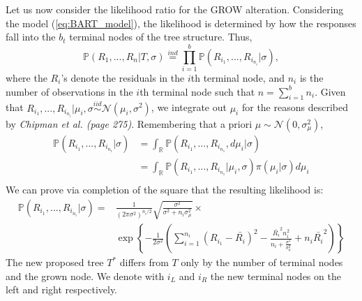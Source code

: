 \documentclass[11pt,a4paper]{article}
\newcommand{\prob}{\mathbb{P}}
\begin{document}
Let us now consider the likelihood ratio for the GROW alteration.
Considering the model (\ref{eq:BART_model}), the likelihood is determined by how the responses fall into the $b_t$ terminal nodes of the tree structure. Thus,
\begin{equation}
    \label{eq:likelihood_ratio_deriv}
    \prob(R_1, ... , R_n | T, \sigma) \overset{ind}{=} \prod_{i = 1}^b \prob(R_{i_1}, ... , R_{i_{n_i}} | \sigma),
\end{equation}
where the $R_i$'s denote the residuals in the $i$th terminal node, and $n_i$ is the number of observations in the $i$th terminal node such that $n = \sum_{i=1}^b n_i$.
Given that $R_{i_1}, ... , R_{i_{n_i}} | \mu_i, \sigma \overset{iid}{\sim} \mathcal{N}(\mu_i, \sigma^2)$, we integrate out $\mu_i$ for the reasons described by \textit{Chipman et al. (page 275)}\cite{Chipman_2010}. Remembering that a priori $\mu \sim \mathcal{N}(0, \sigma^2_\mu)$,
\begin{equation}
    \label{eq:likelihood_integrate_out_mu}
    \begin{split}
        \prob(R_{i_1}, ... , R_{i_{n_i}} | \sigma) & = \int_\mathbb{R} \prob(R_{i_1}, ... , R_{i_{n_1}}, d\mu_i| \sigma)                         \\
                                                   & = \int_\mathbb{R} \prob(R_{i_1}, ... , R_{i_{n_1}}| \mu_i, \sigma)\pi(\mu_i | \sigma)d\mu_i \\
    \end{split}
\end{equation}
We can prove via completion of the square that the resulting likelihood is:
\begin{equation}
    \label{eq:likelihood_square_completion}
    \begin{split}
        \prob(R_{i_1}, ... , R_{i_{n_i}} | \sigma) = & \frac{1}{(2\pi\sigma^2)^{n_i/2}}\sqrt{\frac{\sigma^2}{\sigma^2 + n_i \sigma^2_\mu}}\times                                                                                      \\
                                                     & \exp\left\{-\frac{1}{2\sigma^2}\left(\sum_{i=1}^{n_i} (R_{i_1} - \bar{R_{i}})^2 - \frac{\bar{R_i}^2n_i^2}{n_i + \frac{\sigma^2}{\sigma_\mu^2}} + n_i\bar{R_i}^2\right)\right\}
    \end{split}
\end{equation}
The new proposed tree $T^*$ differs from $T$ only by the number of terminal nodes and the grown node. We denote with $i_L$ and $i_R$ the new terminal nodes on the left and right respectively.
\end{document}
